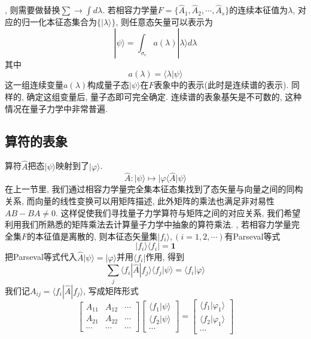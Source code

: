 \documentclass[a4paper,11pt]{book}
\newcommand{\A}{\hat{A}}
\begin{document}
, 则需要做替换$\sum\to\int d\lambda$. 若相容力学量$F=\{\A_1,\A_2,\cdots,\A_s\}$的连续本征值为$\lambda$, 对应的归一化本征态集合为$\{|\lambda\rangle\}$, 则任意态矢量可以表示为
\begin{equation*}
  |\psi\rangle=\int_{\sigma_e}a(\lambda)|\lambda\rangle d\lambda
\end{equation*}
其中
\begin{equation*}
  a(\lambda)=\langle\lambda|\psi\rangle
\end{equation*}
这一组连续变量$a(\lambda)$构成量子态$|\psi\rangle$在$F$表象中的表示(此时是连续谱的表示). 同样的, 确定这组变量后, 量子态即可完全确定. 连续谱的表象基矢是不可数的, 这种情况在量子力学中非常普遍.
\subsection{算符的表象}
算符$\A$把态$|\psi\rangle$映射到了$|\varphi\rangle$.
\begin{equation*}
  \A:|\psi\rangle\longmapsto|\varphi\langle\A|\psi\rangle
\end{equation*}
在上一节里, 我们通过相容力学量完全集本征态集找到了态矢量与向量之间的同构关系, 而向量的线性变换可以用矩阵描述, 此外矩阵的乘法也满足非对易性$AB-BA\neq0$. 这样促使我们寻找量子力学算符与矩阵之间的对应关系, 我们希望利用我们所熟悉的矩阵乘法去计算量子力学中抽象的算符乘法.
, 若相容力学量完全集$F$的本征值是离散的, 则本征态矢量集$|f_i\rangle,(i=1,2,\cdots)$有Parseval等式
\begin{equation*}
  |f_i\rangle\langle f_i|=\mathbf{1}
\end{equation*}
把Parseval等式代入$\A|\psi\rangle=|\varphi\rangle$并用$\langle f_i|$作用, 得到
\begin{equation*}
  \sum_{j}\langle f_i|\A|f_j\rangle\langle f_j|\psi\rangle=\langle f_i|\varphi\rangle
\end{equation*}
我们记$A_{ij}=\langle f_i|\A|f_j\rangle$, 写成矩阵形式
\begin{equation*}
\begin{bmatrix}
  A_{11} & A_{12} & \cdots \\
  A_{21} & A_{22} & \cdots \\
  \cdots & \cdots & \cdots
\end{bmatrix}\begin{bmatrix}
               \langle f_1|\psi\rangle \\
               \langle f_2|\psi\rangle \\
               \cdots
             \end{bmatrix}=\begin{bmatrix}
                             \langle f_1|\varphi_1\rangle \\
                             \langle f_2|\varphi_1\rangle \\
                             \cdots
                           \end{bmatrix}
\end{equation*}
\end{document}
